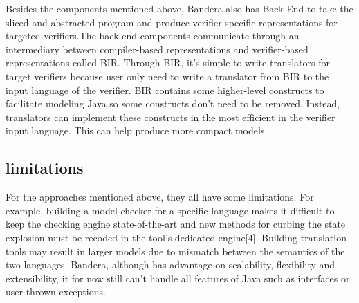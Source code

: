 \documentclass{article}
\begin{document}
Besides the components mentioned above, Bandera also has Back End to take the sliced and abstracted program and produce verifier-specific representations for targeted verifiers.The back end components communicate through an intermediary between compiler-based representations and 
verifier-based representations called BIR. Through BIR, it's simple to  write translators for target verifiers because user only need to write a translator from BIR to the input language of the verifier. BIR contains some higher-level constructs to facilitate modeling Java so some constructs don't need to be removed. Instead, translators can implement these constructs in the most efficient in the verifier input language. This can help produce more compact models.

\subsection{limitations}
For the approaches mentioned above, they all have some limitations. For example, building a model checker for a specific language makes it difficult to keep the checking engine state-of-the-art and new methods for curbing the state explosion must be recoded in the tool’s dedicated engine[4]. Building translation tools may result in larger models due to mismatch between the semantics of the two languages. Bandera, although has advantage on scalability, flexibility and extensibility, it for now still can't handle all features of Java such as  interfaces or user-thrown exceptions.
\end{document}
